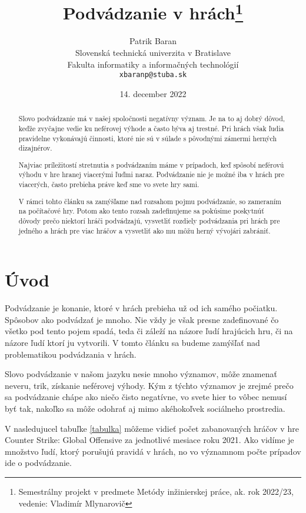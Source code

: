 \documentclass[10pt, oneside, slovak,a4paper]{article}
\title{Podvádzanie v hrách\thanks{Semestrálny projekt v predmete Metódy inžinierskej práce, ak. rok 2022/23, vedenie: Vladimír Mlynarovič}} %
\author{Patrik Baran\\[2pt]
	{\small Slovenská technická univerzita v Bratislave}\\
	{\small Fakulta informatiky a informačných technológií}\\
	{\small \texttt{xbaranp@stuba.sk}}
	}
\date{\small 14. december 2022}
\begin{document}
\maketitle

\begin{abstract}
Slovo podvádzanie má v našej spoločnosti negatívny význam. Je na to aj dobrý dôvod, keďže zvyčajne vedie ku neférovej výhode a často býva aj trestné. Pri hrách však ľudia pravidelne vykonávajú činnosti, ktoré nie sú v súlade s pôvodnými zámermi herných dizajnérov.

Najviac príležitostí stretnutia s podvádzaním máme v prípadoch, keď spôsobí neférovú výhodu v hre hranej viacerými ľuďmi naraz. Podvádzanie nie je možné iba v hrách pre viacerých, často prebieha práve keď sme vo svete hry sami.

V rámci tohto článku sa zamýšľame nad rozsahom pojmu podvádzanie, so zameraním na počítačové hry. Potom ako tento rozsah zadefinujeme sa pokúsime poskytnúť dôvody prečo niektorí hráči podvádzajú, vysvetliť rozdiely podvádzania pri hrách pre jedného a hrách pre viac hráčov a vysvetliť ako mu môžu herný vývojári zabrániť.
\end{abstract}

\newpage


\section*{Úvod}


Podvádzanie je konanie, ktoré v hrách prebieha už od ich samého počiatku. Spôsobov ako podvádzať je mnoho. Nie vždy je však presne zadefinované čo všetko pod tento pojem spadá, teda či záleží na názore ľudí hrajúcich hru, či na názore ľudí ktorí ju vytvorili. V tomto článku sa budeme zamýšľať nad problematikou podvádzania v hrách.

Slovo podvádzanie v našom jazyku nesie mnoho významov, môže znamenať neveru, trik, získanie neférovej výhody. Kým z týchto významov je zrejmé prečo sa podvádzanie chápe ako niečo čisto negatívne, vo svete hier to vôbec nemusí byť tak, nakoľko sa môže odohrať aj mimo akéhokoľvek sociálneho prostredia.

V nasledujucel tabuľke \ref{tabulka} môžeme vidieť počet zabanovaných hráčov v hre Counter Strike: Global Offensive za jednotlivé mesiace roku 2021. Ako vidíme je množstvo ľudí, ktorý porušujú pravidá v hrách, no vo významnom počte prípadov ide o podvádzanie.
\end{document}
